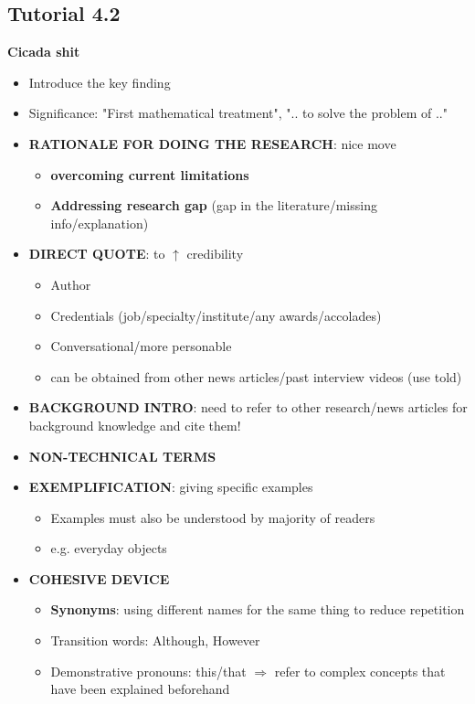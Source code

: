 \documentclass{article}
\begin{document}
\begin{multicols}{2}
\subsection{Tutorial 4.2}
\textbf{Cicada shit}
\begin{itemize}
	\item Introduce the key finding
	\item Significance: "First mathematical treatment", ".. to solve the problem of .."
	\item \textbf{RATIONALE FOR DOING THE RESEARCH}: nice move
	\begin{itemize}
		\item \textbf{overcoming current limitations}
		\item \textbf{Addressing research gap} (gap in the literature/missing info/explanation)
	\end{itemize}
    \item \textbf{DIRECT QUOTE}: to $\uparrow$ credibility
    \begin{itemize}
    	\item Author
    	\item Credentials (job/specialty/institute/any awards/accolades)
    	\item Conversational/more personable
    	\item can be obtained from other news articles/past interview videos (use told)
    \end{itemize}
	\item \textbf{BACKGROUND INTRO}: need to refer to other research/news articles for background knowledge and cite them!
	\item \textbf{NON-TECHNICAL TERMS}
	\item \textbf{EXEMPLIFICATION}: giving specific examples
	\begin{itemize}
		\item Examples must also be understood by majority of readers
		\item e.g. everyday objects
	\end{itemize}
	\item \textbf{COHESIVE DEVICE}
	\begin{itemize}
		\item \textbf{Synonyms}: using different names for the same thing to reduce repetition
		\item Transition words: Although, However
		\item Demonstrative pronouns: this/that $\Rightarrow$ refer to complex concepts that have been explained beforehand

\end{itemize}
\end{itemize}
\end{multicols}
\end{document}
